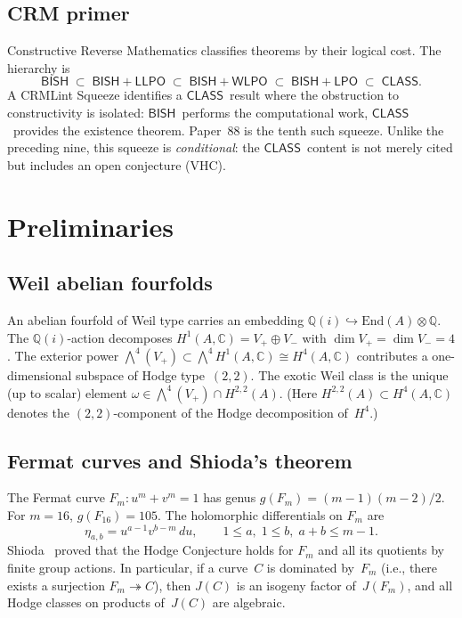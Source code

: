 \documentclass[11pt]{article}
\theoremstyle{plain}
\theoremstyle{definition}
\theoremstyle{remark}
\newcommand{\Q}{\mathbb{Q}}
\newcommand{\C}{\mathbb{C}}
\newcommand{\End}{\mathrm{End}}
\newcommand{\BISH}{\ensuremath{\mathsf{BISH}}}
\newcommand{\LPO}{\ensuremath{\mathsf{LPO}}}
\newcommand{\WLPO}{\ensuremath{\mathsf{WLPO}}}
\newcommand{\LLPO}{\ensuremath{\mathsf{LLPO}}}
\newcommand{\CLASS}{\ensuremath{\mathsf{CLASS}}}
\begin{document}
\subsection{CRM primer}

Constructive Reverse Mathematics classifies theorems by their
logical cost.  The hierarchy is
\[
  \BISH \;\subset\; \BISH{+}\LLPO \;\subset\; \BISH{+}\WLPO
  \;\subset\; \BISH{+}\LPO \;\subset\; \CLASS.
\]
A CRMLint Squeeze identifies a \CLASS\ result where the obstruction
to constructivity is isolated: \BISH\ performs the computational
work, \CLASS\ provides the existence theorem.  Paper~88 is the
tenth such squeeze.  Unlike the preceding nine, this squeeze is
\emph{conditional}: the \CLASS\ content is not merely cited but
includes an open conjecture (VHC).

\section{Preliminaries}
\label{sec:prelim}

\subsection{Weil abelian fourfolds}

An abelian fourfold of Weil type carries an embedding
$\Q(i) \hookrightarrow \End(A) \otimes \Q$.  The $\Q(i)$-action
decomposes $H^1(A,\C) = V_+ \oplus V_-$ with
$\dim V_+ = \dim V_- = 4$.  The exterior power
$\bigwedge^4(V_+) \subset \bigwedge^4 H^1(A,\C) \cong H^4(A,\C)$
contributes a one-dimensional subspace of Hodge type~$(2,2)$.
The exotic Weil class is the unique
(up to scalar) element $\omega \in \bigwedge^4(V_+) \cap H^{2,2}(A)$.
(Here $H^{2,2}(A) \subset H^4(A,\C)$ denotes the $(2,2)$-component
of the Hodge decomposition of~$H^4$.)

\subsection{Fermat curves and Shioda's theorem}

The Fermat curve $F_m\colon u^m + v^m = 1$ has genus
$g(F_m) = (m-1)(m-2)/2$.  For $m = 16$, $g(F_{16}) = 105$.
The holomorphic differentials on $F_m$ are
\[
  \eta_{a,b} = u^{a-1} v^{b-m}\,du, \qquad
  1 \leq a,\; 1 \leq b,\; a + b \leq m - 1.
\]
Shioda~\cite{Shioda82} proved that the Hodge Conjecture holds
for $F_m$ and all its quotients by finite group actions.
In particular, if a curve~$C$ is dominated by~$F_m$
(i.e., there exists a surjection $F_m \twoheadrightarrow C$),
then $J(C)$ is an isogeny factor of~$J(F_m)$, and all Hodge
classes on products of~$J(C)$ are algebraic.
\end{document}
